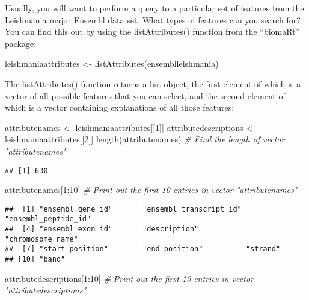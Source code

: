 \documentclass[
]{book}
\newenvironment{Shaded}{\begin{snugshade}}{\end{snugshade}}
\newcommand{\CommentTok}[1]{\textcolor[rgb]{0.56,0.35,0.01}{\textit{#1}}}
\newcommand{\DecValTok}[1]{\textcolor[rgb]{0.00,0.00,0.81}{#1}}
\newcommand{\FunctionTok}[1]{\textcolor[rgb]{0.00,0.00,0.00}{#1}}
\newcommand{\NormalTok}[1]{#1}
\newcommand{\OtherTok}[1]{\textcolor[rgb]{0.56,0.35,0.01}{#1}}
\newcommand{\SpecialCharTok}[1]{\textcolor[rgb]{0.00,0.00,0.00}{#1}}
\begin{document}
Usually, you will want to perform a query to a particular set of features from the Leishmania major Ensembl data set. What types of features can you search for? You can find this out by using the listAttributes() function from the ``biomaRt'' package:

\begin{Shaded}
\begin{Highlighting}[]
\NormalTok{leishmaniaattributes }\OtherTok{\textless{}{-}} \FunctionTok{listAttributes}\NormalTok{(ensemblleishmania)}
\end{Highlighting}
\end{Shaded}

The listAttributes() function returns a list object, the first element of which is a vector of all possible features that you can select, and the second element of which is a vector containing explanations of all those features:

\begin{Shaded}
\begin{Highlighting}[]
\NormalTok{attributenames }\OtherTok{\textless{}{-}}\NormalTok{ leishmaniaattributes[[}\DecValTok{1}\NormalTok{]]}
\NormalTok{attributedescriptions }\OtherTok{\textless{}{-}}\NormalTok{ leishmaniaattributes[[}\DecValTok{2}\NormalTok{]]}
\FunctionTok{length}\NormalTok{(attributenames)        }\CommentTok{\# Find the length of vector "attributenames"}
\end{Highlighting}
\end{Shaded}

\begin{verbatim}
## [1] 630
\end{verbatim}

\begin{Shaded}
\begin{Highlighting}[]
\NormalTok{attributenames[}\DecValTok{1}\SpecialCharTok{:}\DecValTok{10}\NormalTok{]          }\CommentTok{\# Print out the first 10 entries in vector "attributenames"}
\end{Highlighting}
\end{Shaded}

\begin{verbatim}
##  [1] "ensembl_gene_id"       "ensembl_transcript_id" "ensembl_peptide_id"   
##  [4] "ensembl_exon_id"       "description"           "chromosome_name"      
##  [7] "start_position"        "end_position"          "strand"               
## [10] "band"
\end{verbatim}

\begin{Shaded}
\begin{Highlighting}[]
\NormalTok{attributedescriptions[}\DecValTok{1}\SpecialCharTok{:}\DecValTok{10}\NormalTok{]   }\CommentTok{\# Print out the first 10 entries in vector "attributedescriptions"}
\end{Highlighting}
\end{Shaded}
\end{document}
